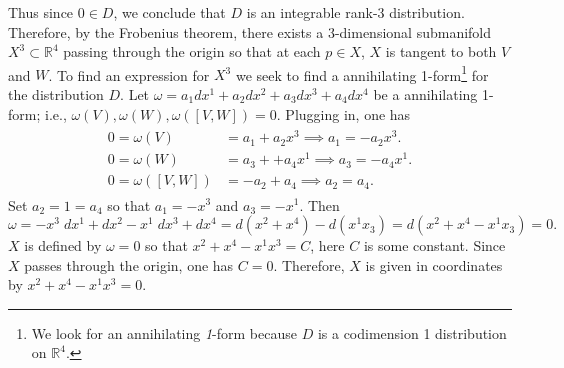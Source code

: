 \documentclass{article}
\begin{document}
	Thus since $0 \in D$, we conclude that $D$ is an integrable rank-3 distribution. Therefore, by the Frobenius theorem, there exists a 3-dimensional submanifold $X^{3} \subset \mathbb{R}^{4}$ passing through the origin so that at each $p \in X$, $X$ is tangent to both $V$ and $W$. To find an expression for $X^{3}$ we seek to find a annihilating 1-form\footnote{We look for an annihilating \textit{1}-form because $D$ is a codimension 1 distribution on $\mathbb{R}^{4}$.} for the distribution $D$. Let $\omega = a_{1}dx^{1} + a_{2}dx^{2} + a_{3}dx^{3} + a_{4}dx^{4}$ be a annihilating 1-form; i.e., $\omega(V), \omega(W), \omega([V, W])= 0$. Plugging in, one has 
	\begin{align*}
		\begin{split}
			0 = \omega(V) &= a_{1} + a_{2}x^{3} \implies a_{1} =-a_{2}x^{3}. \\
			0 = \omega(W) &= a_{3} + + a_{4}x^{1} \implies a_{3} = -a_{4}x^{1}. \\
			0 = \omega([V,W]) &= -a_{2} + a_{4} \implies a_{2} = a_{4}. 
		\end{split}
	\end{align*}
	Set $a_{2} = 1 = a_{4}$ so that $a_{1} = -x^{3}$ and $a_{3} = -x^{1}$. Then 
	\begin{equation*}
		\omega = -x^{3}\;dx^{1} + dx^{2} -x^{1}\;dx^{3} + dx^{4} = d(x^{2} + x^{4}) - d(x^{1}x_{3}) = d(x^{2} + x^{4} - x^{1}x_{3}) = 0. 
	\end{equation*}
	$X$ is defined by $\omega = 0$ so that $x^{2}+ x^{4} - x^{1}x^{3} = C$, here $C$ is some constant. Since $X$ passes through the origin, one has $C = 0$. Therefore, $X$ is given in coordinates by $x^{2} + x^{4} - x^{1}x^{3}= 0$. 
	
\end{document}
